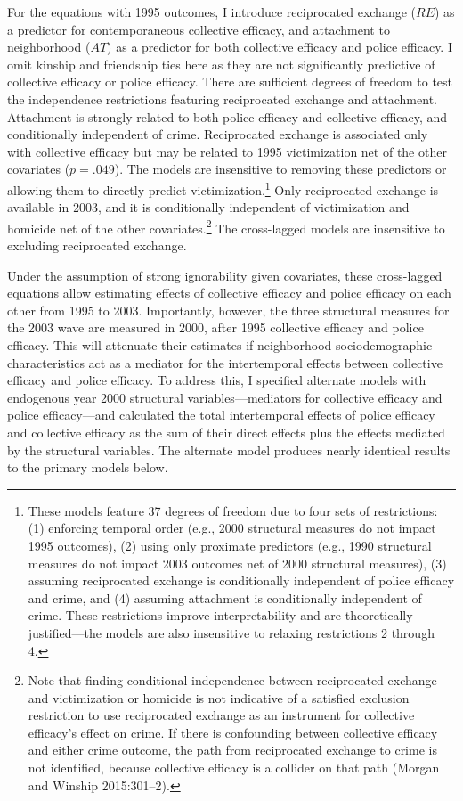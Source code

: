 \documentclass [11pt, proquest] {uwthesis}[2015/03/03]
\begin{document}
For the equations with 1995 outcomes, I introduce reciprocated exchange (\(RE\)) as a predictor for contemporaneous collective efficacy, and attachment to neighborhood (\(AT\)) as a predictor for both collective efficacy and police efficacy. I omit kinship and friendship ties here as they are not significantly predictive of collective efficacy or police efficacy. There are sufficient degrees of freedom to test the independence restrictions featuring reciprocated exchange and attachment. Attachment is strongly related to both police efficacy and collective efficacy, and conditionally independent of crime. Reciprocated exchange is associated only with collective efficacy but may be related to 1995 victimization net of the other covariates (\(p=.049\)). The models are insensitive to removing these predictors or allowing them to directly predict victimization.\footnote{These models feature 37 degrees of freedom due to four sets of restrictions: (1) enforcing temporal order (e.g., 2000 structural measures do not impact 1995 outcomes), (2) using only proximate predictors (e.g., 1990 structural measures do not impact 2003 outcomes net of 2000 structural measures), (3) assuming reciprocated exchange is conditionally independent of police efficacy and crime, and (4) assuming attachment is conditionally independent of crime. These restrictions improve interpretability and are theoretically justified---the models are also insensitive to relaxing restrictions 2 through 4.} Only reciprocated exchange is available in 2003, and it is conditionally independent of victimization and homicide net of the other covariates.\footnote{Note that finding conditional independence between reciprocated exchange and victimization or homicide is not indicative of a satisfied exclusion restriction to use reciprocated exchange as an instrument for collective efficacy's effect on crime. If there is confounding between collective efficacy and either crime outcome, the path from reciprocated exchange to crime is not identified, because collective efficacy is a collider on that path (Morgan and Winship 2015:301--2).} The cross-lagged models are insensitive to excluding reciprocated exchange.

Under the assumption of strong ignorability given covariates, these cross-lagged equations allow estimating effects of collective efficacy and police efficacy on each other from 1995 to 2003. Importantly, however, the three structural measures for the 2003 wave are measured in 2000, after 1995 collective efficacy and police efficacy. This will attenuate their estimates if neighborhood sociodemographic characteristics act as a mediator for the intertemporal effects between collective efficacy and police efficacy. To address this, I specified alternate models with endogenous year 2000 structural variables---mediators for collective efficacy and police efficacy---and calculated the total intertemporal effects of police efficacy and collective efficacy as the sum of their direct effects plus the effects mediated by the structural variables. The alternate model produces nearly identical results to the primary models below.
\end{document}
